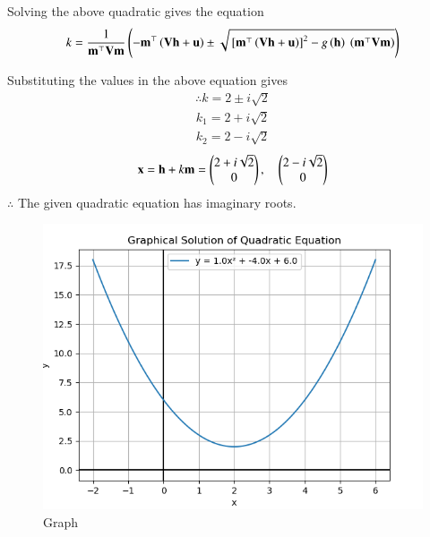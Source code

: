 \documentclass[journal]{IEEEtran}
\begin{document}
Solving the above quadratic gives the equation
\begin{align}
k = \frac{1}{\mathbf{m}^{\top}\mathbf{V}\mathbf{m}}
\left(
    -\mathbf{m}^{\top} \left(\mathbf{V}\mathbf{h} + \mathbf{u}\right)
    \pm
    \sqrt{ {}\left[\mathbf{m}^{\top}\left(\mathbf{V}\mathbf{h} + \mathbf{u}\right)\right]^2
    - g\left(\mathbf{h}\right) \ \left(\mathbf{m}^{\top}\mathbf{V}\mathbf{m}\right) }
    \right)
\end{align}

Substituting the values in the above equation gives
\begin{align}
\therefore k =2 \pm i\sqrt{2}
\end{align}
\begin{align}
 k_1 = 2 + i\sqrt{2}\\
 k_2 = 2 - i\sqrt{2}
\end{align}
\begin{align}
    \mathbf{x} = \mathbf{h} + k\mathbf{m}
   = \begin{pmatrix}2 + i\sqrt{2} \\ 0\end{pmatrix},\quad
     \begin{pmatrix}2 - i\sqrt{2} \\ 0\end{pmatrix}
\end{align}
$\therefore$ The given quadratic equation has imaginary roots.
\begin{figure}[h]
    \centering
    \includegraphics[width=\columnwidth]{figs/fig.png}
    \caption{Graph}
    \label{fig:fig}
 \end{figure}
\end{document}

